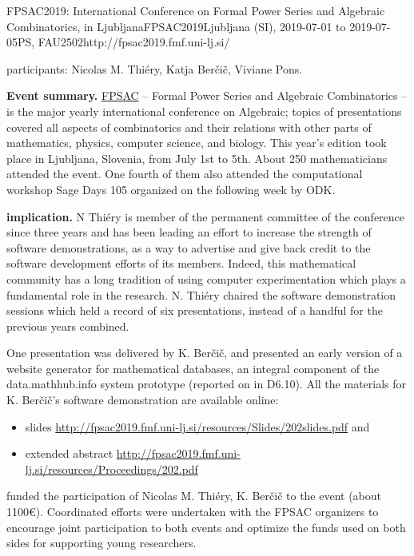 \begin{event}{FPSAC2019: International Conference on Formal Power Series and Algebraic Combinatorics, in Ljubljana}{FPSAC2019}{Ljubljana (SI),
  2019-07-01 to
  2019-07-05}{PS, FAU}{250}{2}{http://fpsac2019.fmf.uni-lj.si/}

\ODK participants: Nicolas M. Thi\'ery, Katja Ber\v{c}i\v{c}, Viviane
Pons.

\textbf{Event summary.} \href{http://fpsac.org}{FPSAC} -- Formal Power
Series and Algebraic Combinatorics -- is the major yearly
international conference on Algebraic; topics of presentations covered
all aspects of combinatorics and their relations with other parts of
mathematics, physics, computer science, and biology. This year's
edition took place in Ljubljana, Slovenia, from July 1st to 5th. About
250 mathematicians attended the event. One fourth of them also
attended the computational workshop Sage Days 105 organized on the
following week by ODK.

\textbf{\ODK implication.} N Thiéry is member of the permanent
committee of the conference since three years and has been leading an
effort to increase the strength of software demonstrations, as a way
to advertise and give back credit to the software development efforts
of its members. Indeed, this mathematical community has a long
tradition of using computer experimentation which plays a fundamental
role in the research. N. Thiéry chaired the software demonstration
sessions which held a record of six presentations, instead of a
handful for the previous years combined.

One presentation was delivered by K. Ber\v{c}i\v{c}, and presented an
early version of a website generator for mathematical databases, an
integral component of the \textsf{data.math\-hub.info} system
prototype (reported on in D6.10). All the materials for K.
Ber\v{c}i\v{c}'s software demonstration are available online:
\begin{itemize}
\item slides \url{http://fpsac2019.fmf.uni-lj.si/resources/Slides/202slides.pdf} and
\item extended abstract \url{http://fpsac2019.fmf.uni-lj.si/resources/Proceedings/202.pdf}
\end{itemize}

\ODK funded the participation of Nicolas M. Thiéry, K. Ber\v{c}i\v{c}
to the event (about 1100\euro). Coordinated efforts were undertaken
with the FPSAC organizers to encourage joint participation to both
events and optimize the funds used on both sides for supporting young
researchers.


\end{event}

